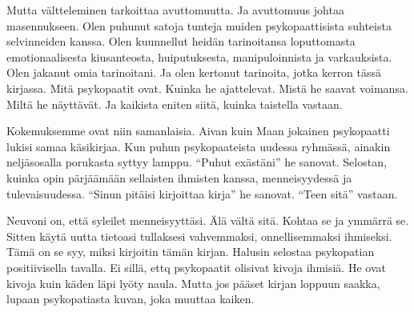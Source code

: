 Mutta vältteleminen tarkoittaa avuttomuutta. Ja avuttomuus johtaa masennukseen. Olen puhunut satoja tunteja muiden psykopaattisista suhteista selvinneiden kanssa. Olen kuunnellut heidän tarinoitansa loputtomasta emotionaalisesta kiusanteosta, huiputuksesta, manipuloinnista ja varkauksista. Olen jakanut omia tarinoitani. Ja olen kertonut tarinoita, jotka kerron tässä kirjassa. Mitä psykopaatit ovat. Kuinka he ajattelevat. Mistä he saavat voimansa. Miltä he näyttävät. Ja kaikista eniten siitä, kuinka taistella vastaan.

Kokemuksemme ovat niin samanlaisia. Aivan kuin Maan jokainen psykopaatti lukisi samaa käsikirjaa. Kun puhun psykopaateista uudessa ryhmässä, ainakin neljäsosalla porukasta syttyy lamppu. ``Puhut exästäni\vmq{,}'' he sanovat. Selostan, kuinka opin pärjäämään sellaisten ihmisten kanssa, menneisyydessä ja tulevaisuudessa. ``Sinun pitäisi kirjoittaa kirja\vmq{,}'' he sanovat. ``Teen sitä\vmq{,}'' vastaan.

Neuvoni on, että syleilet menneisyyttäsi. Älä vältä sitä. Kohtaa se ja ymmärrä se. Sitten käytä uutta tietoasi tullaksesi vahvemmaksi, onnellisemmaksi ihmiseksi. Tämä on se syy, miksi kirjoitin tämän kirjan. Halusin selostaa psykopatian positiivisella tavalla. Ei sillä, ettq psykopaatit olisivat kivoja ihmisiä. He ovat kivoja kuin käden läpi lyöty naula. Mutta jos pääset kirjan loppuun saakka, lupaan psykopatiasta kuvan, joka muuttaa kaiken.
